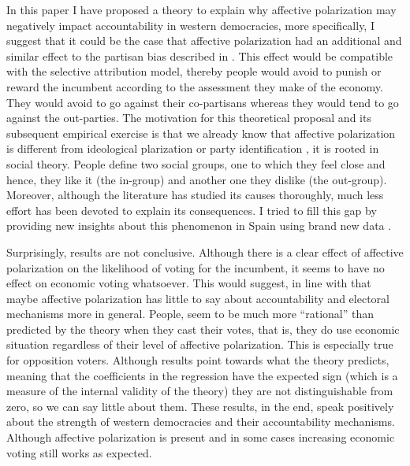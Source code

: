 \documentclass[a4paper, svgnames]{article}
\begin{document}
In this paper I have proposed a theory to explain why affective polarization may negatively impact accountability in western democracies, more specifically, I suggest that it could be the case that affective polarization had an additional and similar effect to the partisan bias described in \citet*{tilleyGovernmentBlameExperimental2011a}. This effect would be compatible with the selective attribution model, thereby people would avoid to punish or reward the incumbent according to the assessment they make of the economy. They would avoid to go against their co-partisans whereas they would tend to go against the out-parties. The motivation for this theoretical proposal and its subsequent empirical exercise is that we already know that affective polarization is different from ideological plarization or party identification \citep*{Reiljan2020,Wagner2021}, it is rooted in social theory. People define two social groups, one to which they feel close and hence, they like it (the in-group) and another one they dislike (the out-group). Moreover, although the literature has studied its causes thoroughly, much less effort has been devoted to explain its consequences. I tried to fill this gap by providing new insights about this phenomenon in Spain using brand new data \citep*{Torcal2020}. 

Surprisingly, results are not conclusive. Although there is a clear effect of affective polarization on the likelihood of voting for the incumbent, it seems to have no effect on economic voting whatsoever. This would suggest, in line with \citet*{broockmanDoesAffectivePolarization2020} that maybe affective polarization has little to say about accountability and electoral mechanisms more in general. People, seem to be much more ``rational'' than predicted by the theory when they cast their votes, that is, they do use economic situation regardless of their level of affective polarization. This is especially true for opposition voters. Although results point towards what the theory predicts, meaning that the coefficients in the regression have the expected sign (which is a measure of the internal validity of the theory) they are not distinguishable from zero, so we can say little about them. These results, in the end, speak positively about the strength of western democracies and their accountability mechanisms. Although affective polarization is present and in some cases increasing \citep*{Rogowski2016a, WESTWOOD2018, Gidron2019} economic voting still works as expected. 
\end{document}

